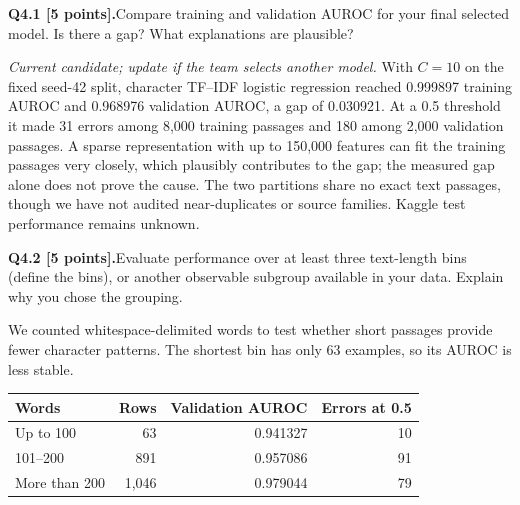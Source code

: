 \documentclass[11pt,letterpaper]{article}
\newcommand{\question}[2]{\needspace{4\baselineskip}\par\addvspace{0.45em}\noindent\textbf{#1}\quad #2\par\nobreak\vspace{0.1em}}
\begin{document}
\question{Q4.1 [5 points].}{Compare training and validation AUROC for your final selected model. Is there a gap? What explanations are plausible?}
\textit{Current candidate; update if the team selects another model.} With $C=10$ on the fixed seed-42 split, character TF--IDF logistic regression reached 0.999897 training AUROC and 0.968976 validation AUROC, a gap of 0.030921. At a 0.5 threshold it made 31 errors among 8,000 training passages and 180 among 2,000 validation passages. A sparse representation with up to 150,000 features can fit the training passages very closely, which plausibly contributes to the gap; the measured gap alone does not prove the cause. The two partitions share no exact text passages, though we have not audited near-duplicates or source families. Kaggle test performance remains unknown.
\question{Q4.2 [5 points].}{Evaluate performance over at least three text-length bins (define the bins), or another observable subgroup available in your data. Explain why you chose the grouping.}
We counted whitespace-delimited words to test whether short passages provide fewer character patterns. The shortest bin has only 63 examples, so its AUROC is less stable.
\begin{tabular}{lrrr}\toprule Words & Rows & Validation AUROC & Errors at 0.5 \\ \midrule
Up to 100 & 63 & 0.941327 & 10 \\
101--200 & 891 & 0.957086 & 91 \\
More than 200 & 1,046 & 0.979044 & 79 \\ \bottomrule
\end{tabular}
\end{document}
